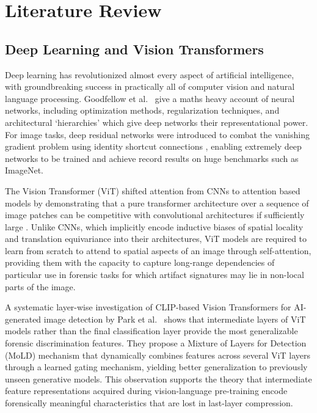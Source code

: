 \chapter{Literature Review}
\label{ch:literature}

\section{Deep Learning and Vision Transformers}

Deep learning has revolutionized almost every aspect of artificial intelligence, with groundbreaking success in practically all of computer vision and natural language processing. Goodfellow et al.~\cite{goodfellow2016deep} give a maths heavy account of neural networks, including optimization methods, regularization techniques, and architectural ‘hierarchies’ which give deep networks their representational power. For image tasks, deep residual networks were introduced to combat the vanishing gradient problem using identity shortcut connections \cite{he2016deep}, enabling extremely deep networks to be trained and achieve record results on huge benchmarks such as ImageNet. 

The Vision Transformer (ViT) shifted attention from CNNs to attention based models by demonstrating that a pure transformer architecture over a sequence of image patches can be competitive with convolutional architectures if sufficiently large \cite{dosovitskiy2020image}. Unlike CNNs, which implicitly encode inductive biases of spatial locality and translation equivariance into their architectures, ViT models are required to learn from scratch to attend to spatial aspects of an image through self-attention, providing them with the capacity to capture long-range dependencies of particular use in forensic tasks for which artifact signatures may lie in non-local parts of the image.

A systematic layer-wise investigation of CLIP-based Vision Transformers for AI-generated image detection by Park et al.~\cite{park2025rethinking} shows that intermediate layers of ViT models rather than the final classification layer provide the most generalizable forensic discrimination features. They propose a Mixture of Layers for Detection (MoLD) mechanism that dynamically combines features across several ViT layers through a learned gating mechanism, yielding better generalization to previously unseen generative models. This observation supports the theory that intermediate feature representations acquired during vision-language pre-training encode forensically meaningful characteristics that are lost in last-layer compression.

